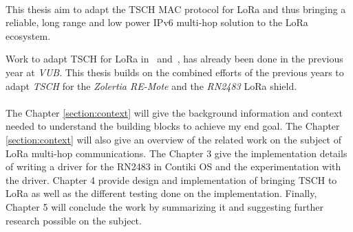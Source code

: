 \paragraph{}

This thesis aim to adapt the TSCH MAC protocol for LoRa
and thus bringing a reliable, long range and low power IPv6 multi-hop
solution to the LoRa ecosystem.

Work to adapt TSCH for LoRa in~\cite{8847137} and~\cite{njomgang_2018}, has
already been done in the previous year at \emph{VUB}.
This thesis builds on the combined efforts of the previous
years to adapt \emph{TSCH} for the \emph{Zolertia RE-Mote} and the
\emph{RN2483} LoRa shield.

\paragraph{}

The Chapter \ref{section:context} will give the background information and context needed to
understand the building blocks to achieve my end goal.
The Chapter \ref{section:context} will also give an overview of the related work on the subject of
LoRa multi-hop communications.
The Chapter 3 give the implementation details of writing a driver for the
RN2483 in Contiki OS and the experimentation with the driver.
Chapter 4 provide design and implementation of bringing TSCH to LoRa as well as
the different testing done on the implementation.
Finally, Chapter 5 will conclude the work by summarizing it and suggesting
further research possible on the subject.
